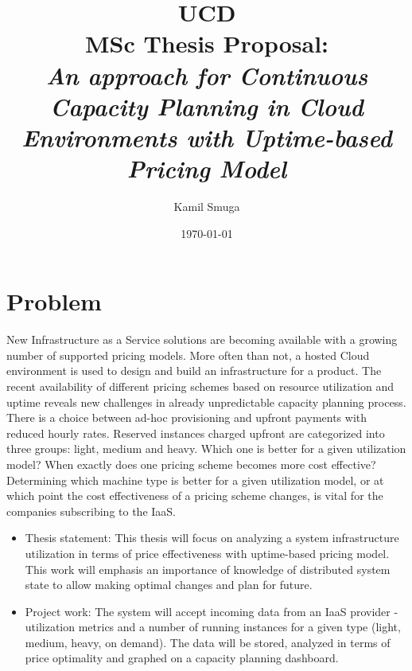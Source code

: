\documentclass[11pt]{artikel3}
\title{UCD\\MSc Thesis Proposal:\\\emph{An approach for Continuous Capacity Planning in Cloud Environments with Uptime-based Pricing Model}}
\author{Kamil Smuga}
\date{\today}
\begin{document}
\maketitle

\section{Problem}

New Infrastructure as a Service solutions are becoming available with a growing number of supported pricing models. More often than not, a hosted Cloud environment is used to design and build an infrastructure for a product. The recent availability of different pricing schemes based on resource utilization and uptime reveals new challenges in already unpredictable capacity planning process. There is a choice between ad-hoc provisioning and upfront payments with reduced hourly rates. Reserved instances charged upfront are categorized into three groups: light, medium and heavy. Which one is better for a given utilization model? When exactly does one pricing scheme becomes more cost effective? Determining which machine type is better for a given utilization model, or at which point the cost effectiveness of a pricing scheme changes, is vital for the companies subscribing to the IaaS. 

\begin{itemize}
\item Thesis statement: This thesis will focus on analyzing a system infrastructure utilization in terms of price effectiveness with uptime-based pricing model. This work will emphasis an importance of knowledge of distributed system state to allow making optimal changes and plan for future.
\item Project work: The system will accept incoming data from an IaaS provider - utilization metrics and a number of running instances for a given type (light, medium, heavy, on demand). The data will be stored, analyzed in terms of price optimality and graphed on a capacity planning dashboard.  
\end{itemize}
\end{document}
